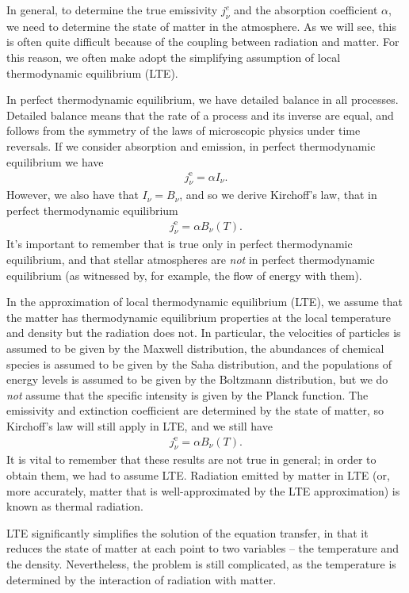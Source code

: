 In general, to determine the true emissivity $j_\nu^{e}$ and the
absorption coefficient $\alpha$, we need to determine the state of
matter in the atmosphere. As we will see, this is often quite difficult
because of the coupling between radiation and matter. For this reason,
we often make adopt the simplifying assumption of local thermodynamic
equilibrium (LTE).

In perfect thermodynamic equilibrium, we have detailed balance in all
processes. Detailed balance means that the rate of a process and its
inverse are equal, and follows from the symmetry of the laws of
microscopic physics under time reversals. If we consider absorption and
emission, in perfect thermodynamic equilibrium  we have
\begin{align}
j_\nu^\mathrm{e} = \alpha I_\nu.
\end{align}
However, we also have that $I_\nu = B_\nu$, and so we derive Kirchoff's
law, that in perfect thermodynamic equilibrium
\begin{align}
j_\nu^\mathrm{e} = \alpha B_\nu(T).
\end{align}
It's important to remember that is true only in perfect thermodynamic
equilibrium, and that stellar atmospheres are \emph{not} in perfect
thermodynamic equilibrium (as witnessed by, for example, the flow of
energy with them).

In the approximation of local thermodynamic equilibrium (LTE), we assume
that the matter has thermodynamic equilibrium properties at the local
temperature and density but the radiation does not. In particular, the
velocities of particles is assumed to be given by the Maxwell
distribution, the abundances of chemical species is assumed to be given
by the Saha distribution, and the populations of energy levels is
assumed to be given by the Boltzmann distribution, but we do \emph{not}
assume that the specific intensity is given by the Planck function. The
emissivity and extinction coefficient are determined by the state of
matter, so Kirchoff's law will still apply in LTE, and we still have
\begin{align}
j_\nu^\mathrm{e} = \alpha B_\nu(T).
\end{align}
It is vital to remember that these results are not true in general; in
order to obtain them, we had to assume LTE. Radiation emitted by matter
in LTE (or, more accurately, matter that is well-approximated by the LTE
approximation) is known as thermal radiation.

LTE significantly simplifies the solution of the equation
transfer, in that it reduces the state of matter at each
point to two variables -- the temperature and the density.
Nevertheless, the problem is still complicated, as the
temperature is determined by the interaction of radiation
with matter.

